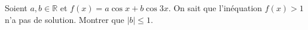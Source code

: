 Soient $a, b \in \mathbb{R}$ et $f(x) = a\cos x + b\cos 3x$. On sait que l'inéquation $f(x) > 1$ n'a pas de solution. Montrer que $|b| \leq 1$.

